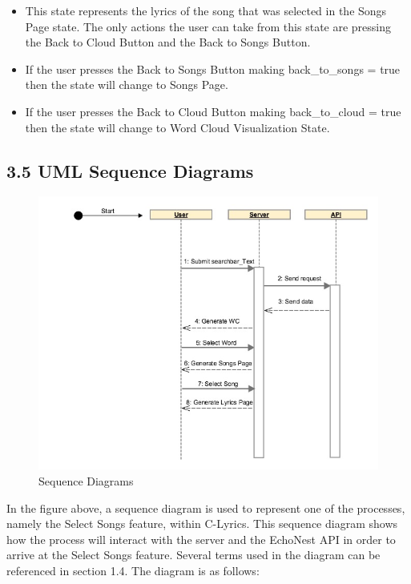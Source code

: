 \documentclass[]{article}
\begin{document}
\begin{itemize}
  \begin{itemize}
  \itemsep1pt\parskip0pt
  \item
    This state represents the lyrics of the song that was selected in
    the Songs Page state. The only actions the user can take from this
    state are pressing the Back to Cloud Button and the Back to Songs
    Button.
  \item
    If the user presses the Back to Songs Button making back\_to\_songs
    = true then the state will change to Songs Page.
  \item
    If the user presses the Back to Cloud Button making back\_to\_cloud
    = true then the state will change to Word Cloud Visualization State.
  \end{itemize}
\end{itemize}

\subsection{3.5 UML Sequence Diagrams}\label{uml-sequence-diagrams}

\begin{figure}[htbp]
\centering
\includegraphics{sequence_diagram.jpg}
\caption{Sequence Diagrams}
\end{figure}

In the figure above, a sequence diagram is used to represent one of the
processes, namely the Select Songs feature, within C-Lyrics. This
sequence diagram shows how the process will interact with the server and
the EchoNest API in order to arrive at the Select Songs feature. Several
terms used in the diagram can be referenced in section 1.4. The diagram
is as follows:
\end{document}
